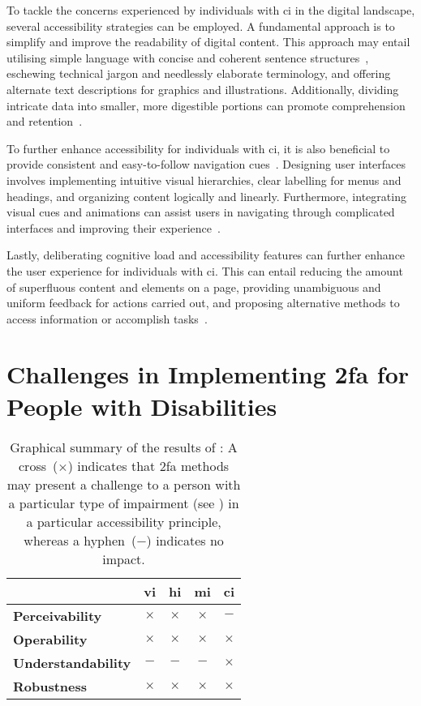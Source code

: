 To tackle the concerns experienced by individuals with \ac{ci} in the digital landscape, several accessibility strategies can be employed. A fundamental approach is to simplify and improve the readability of digital content. This approach may entail utilising simple language with concise and coherent sentence structures~\cite{poulson_2004}, eschewing technical jargon and needlessly elaborate terminology, and offering alternate text descriptions for graphics and illustrations. Additionally, dividing intricate data into smaller, more digestible portions can promote comprehension and retention~\cite{friedman_2008}.

To further enhance accessibility for individuals with \ac{ci}, it is also beneficial to provide consistent and easy-to-follow navigation cues~\cite{leporini_2004}. Designing user interfaces involves implementing intuitive visual hierarchies, clear labelling for menus and headings, and organizing content logically and linearly. Furthermore, integrating visual cues and animations can assist users in navigating through complicated interfaces and improving their experience~\cite{moreno_2021}.

Lastly, deliberating cognitive load and accessibility features can further enhance the user experience for individuals with \ac{ci}. This can entail reducing the amount of superfluous content and elements on a page, providing unambiguous and uniform feedback for actions carried out, and proposing alternative methods to access information or accomplish tasks~\cite{lewis_2011}.

\section{Challenges in Implementing \acs{2fa} for People with Disabilities}
\label{sec:challenges}

\begin{table}[]
\centering
\begin{tabular}{l|c|c|c|c|}
\cline{2-5}
\multicolumn{1}{c|}{\textbf{}}                   & \textbf{\acs{vi}} & \textbf{\acs{hi}} & \textbf{\acs{mi}} & \textbf{\ac{ci}} \\ \hline
\multicolumn{1}{|l|}{\textbf{Perceivability}}    & $\times$    & $\times$    & $\times$    & $-$         \\ \hline
\multicolumn{1}{|l|}{\textbf{Operability}}       & $\times$    & $\times$    & $\times$    & $\times$    \\ \hline
\multicolumn{1}{|l|}{\textbf{Understandability}} & $-$         & $-$         & $-$         & $\times$    \\ \hline
\multicolumn{1}{|l|}{\textbf{Robustness}}        & $\times$    & $\times$    & $\times$    & $\times$    \\ \hline
\end{tabular}
\caption{Graphical summary of the results of : A cross~($\times$) indicates that \ac{2fa} methods may present a challenge to a person with a particular type of impairment (see ) in a particular accessibility principle, whereas a hyphen~($-$) indicates no impact.}
\label{tab:challenges}
\end{table}

